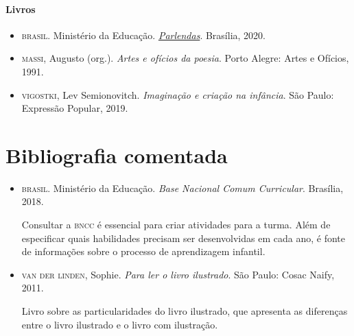 \documentclass[11pt]{extarticle}
\begin{document}
\paragraph{Livros}

\begin{itemize}
\item \textsc{brasil}. Ministério da Educação. \href{http://alfabetizacao.mec.gov.br/images/conta-pra-mim/livros/versao_digital/parlendas_versao_digital.pdf}{\textit{Parlendas}}. Brasília, 2020. 

\item \textsc{massi}, Augusto (org.). \emph{Artes e ofícios da poesia}. Porto Alegre:
  Artes e Ofícios, 1991.

\item \textsc{vigostki}, Lev Semionovitch. \textit{Imaginação e criação na infância}. São Paulo: Expressão Popular, 2019.
\end{itemize}

\section{Bibliografia comentada}

\begin{itemize}
\item \textsc{brasil}. Ministério da Educação. \textit{Base Nacional Comum Curricular}. Brasília, 2018.

Consultar a \textsc{bncc} é essencial para criar atividades para a turma. Além de especificar 
quais habilidades precisam ser desenvolvidas em cada ano, é fonte de informações sobre 
o processo de aprendizagem infantil. 

 
\item \textsc{van der linden}, Sophie. \textit{Para ler o livro ilustrado}. São Paulo: Cosac Naify, 2011.

Livro sobre as particularidades do livro ilustrado, que apresenta as diferenças entre o livro ilustrado e o livro com ilustração. 
\end{itemize}
\end{document}
